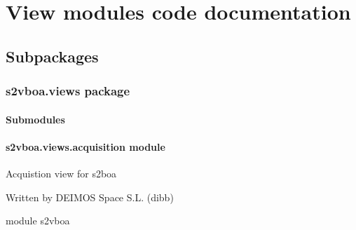 \chapter{View modules code documentation}
\section{Subpackages}
\label{\detokenize{s2vboa:subpackages}}

\subsection{s2vboa.views package}
\label{\detokenize{s2vboa.views:s2vboa-views-package}}\label{\detokenize{s2vboa.views::doc}}

\subsubsection{Submodules}
\label{\detokenize{s2vboa.views:submodules}}

\subsubsection{s2vboa.views.acquisition module}
\label{\detokenize{s2vboa.views:module-s2vboa.views.acquisition}}\label{\detokenize{s2vboa.views:s2vboa-views-acquisition-module}}
Acquistion view for s2boa

Written by DEIMOS Space S.L. (dibb)

module s2vboa

\begin{fulllineitems}
\label{\detokenize{s2vboa.views:s2vboa.views.acquisition.define_what_to_show_acquisition}}
\end{fulllineitems}


